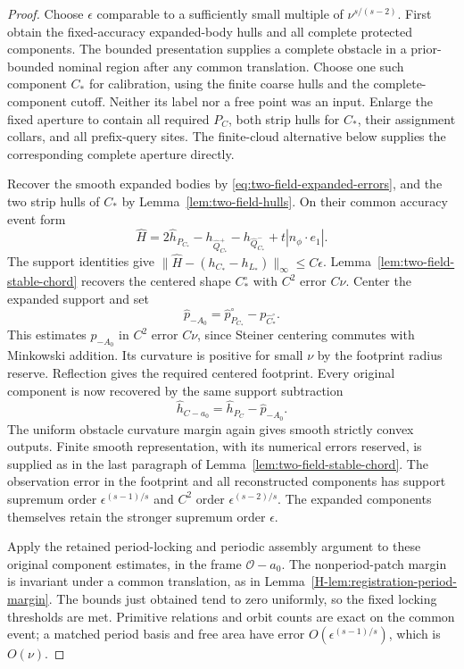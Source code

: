 \begin{proof}
Choose $\epsilon$ comparable to a sufficiently small multiple of
$\nu^{s/(s-2)}$.  First obtain the fixed-accuracy expanded-body
hulls and all complete protected components.  The bounded
presentation supplies a complete obstacle in a prior-bounded nominal
region after any common translation.  Choose one such component $C_*$
for calibration, using the finite coarse hulls and the
complete-component cutoff.  Neither its label nor a free point was
an input.  Enlarge the fixed aperture to contain all required
$P_C$, both strip hulls for $C_*$, their assignment collars, and
all prefix-query sites.  The finite-cloud alternative below supplies
the corresponding complete aperture directly.

Recover the smooth expanded bodies by
\eqref{eq:two-field-expanded-errors}, and the two strip hulls of
$C_*$ by Lemma~\ref{lem:two-field-hulls}.  On their common accuracy
event form
\[
 \widehat H
    =2\widehat h_{P_{C_*}}
       -h_{\widehat Q_{C_*}^+}-h_{\widehat Q_{C_*}^-}
                                  +t|n_\phi\cdot e_1|.
\]
The support identities give
$\|\widehat H-(h_{C_*}-h_{L_*})\|_\infty\le C\epsilon$.
Lemma~\ref{lem:two-field-stable-chord} recovers the centered shape
$C_*^\circ$ with $C^2$ error $C\nu$.  Center the expanded support
and set
\[
  \widehat p_{-A_0}
        =\widehat p_{P_{C_*}}^\circ-
                                    p_{\widehat C_*^\circ}.
\]
This estimates $p_{-A_0}$ in $C^2$ error $C\nu$, since Steiner
centering commutes with Minkowski addition.  Its curvature is positive
for small $\nu$ by the footprint radius reserve.  Reflection gives
the required centered footprint.  Every original component is now
recovered by the same support subtraction
\begin{equation}\label{eq:two-field-finite-subtraction}
       \widehat h_{C-a_0}
                   =\widehat h_{P_C}-\widehat p_{-A_0}.
\end{equation}
The uniform obstacle curvature margin again gives smooth strictly
convex outputs.  Finite smooth representation, with its numerical
errors reserved, is supplied as in the last paragraph of
Lemma~\ref{lem:two-field-stable-chord}.
The observation error in the footprint and all reconstructed
components has support supremum order
$\epsilon^{(s-1)/s}$ and $C^2$ order
$\epsilon^{(s-2)/s}$.  The expanded components themselves retain the
stronger supremum order $\epsilon$.

Apply the retained period-locking and periodic assembly argument to
these original component estimates, in the frame $\mathcal O-a_0$.
The nonperiod-patch margin is invariant under a common translation,
as in Lemma~\ref{H-lem:registration-period-margin}.  The bounds just
obtained tend to zero uniformly, so the fixed locking thresholds are
met.  Primitive relations and orbit counts are exact on the common
event; a matched period basis and free area have error
$O(\epsilon^{(s-1)/s})$, which is $O(\nu)$.


\end{proof}
